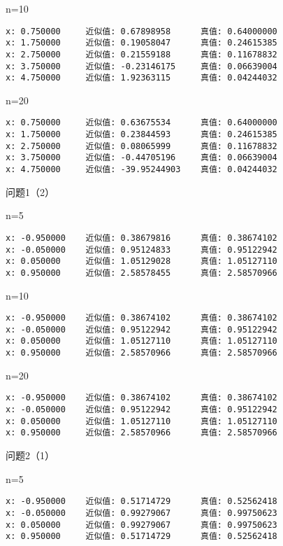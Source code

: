 \documentclass[a4paper,zihao=4,UTF8]{ctexart}
\begin{document}
n=10

\begin{lstlisting}
x: 0.750000     近似值: 0.67898958      真值: 0.64000000
x: 1.750000     近似值: 0.19058047      真值: 0.24615385
x: 2.750000     近似值: 0.21559188      真值: 0.11678832
x: 3.750000     近似值: -0.23146175     真值: 0.06639004
x: 4.750000     近似值: 1.92363115      真值: 0.04244032
\end{lstlisting}

n=20

\begin{lstlisting}
x: 0.750000     近似值: 0.63675534      真值: 0.64000000
x: 1.750000     近似值: 0.23844593      真值: 0.24615385
x: 2.750000     近似值: 0.08065999      真值: 0.11678832
x: 3.750000     近似值: -0.44705196     真值: 0.06639004
x: 4.750000     近似值: -39.95244903    真值: 0.04244032
\end{lstlisting}


问题1（2）

n=5

\begin{lstlisting}
x: -0.950000    近似值: 0.38679816      真值: 0.38674102
x: -0.050000    近似值: 0.95124833      真值: 0.95122942
x: 0.050000     近似值: 1.05129028      真值: 1.05127110
x: 0.950000     近似值: 2.58578455      真值: 2.58570966
\end{lstlisting}

n=10

\begin{lstlisting}
x: -0.950000    近似值: 0.38674102      真值: 0.38674102
x: -0.050000    近似值: 0.95122942      真值: 0.95122942
x: 0.050000     近似值: 1.05127110      真值: 1.05127110
x: 0.950000     近似值: 2.58570966      真值: 2.58570966
\end{lstlisting}

n=20

\begin{lstlisting}
x: -0.950000    近似值: 0.38674102      真值: 0.38674102
x: -0.050000    近似值: 0.95122942      真值: 0.95122942
x: 0.050000     近似值: 1.05127110      真值: 1.05127110
x: 0.950000     近似值: 2.58570966      真值: 2.58570966
\end{lstlisting}

问题2（1）

n=5

\begin{lstlisting}
x: -0.950000    近似值: 0.51714729      真值: 0.52562418
x: -0.050000    近似值: 0.99279067      真值: 0.99750623
x: 0.050000     近似值: 0.99279067      真值: 0.99750623
x: 0.950000     近似值: 0.51714729      真值: 0.52562418
\end{lstlisting}
\end{document}
